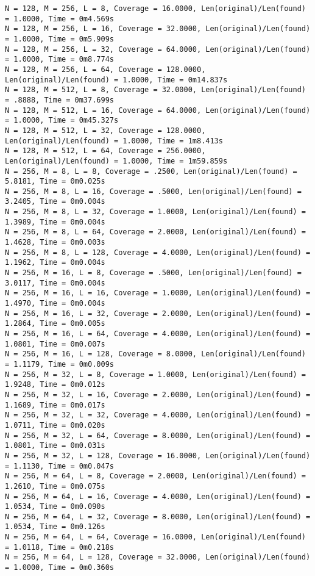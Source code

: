 \documentclass{article}
\begin{document}
{\begin{verbatim}
N = 128, M = 256, L = 8, Coverage = 16.0000, Len(original)/Len(found) = 1.0000, Time = 0m4.569s
N = 128, M = 256, L = 16, Coverage = 32.0000, Len(original)/Len(found) = 1.0000, Time = 0m5.909s
N = 128, M = 256, L = 32, Coverage = 64.0000, Len(original)/Len(found) = 1.0000, Time = 0m8.774s
N = 128, M = 256, L = 64, Coverage = 128.0000, Len(original)/Len(found) = 1.0000, Time = 0m14.837s
N = 128, M = 512, L = 8, Coverage = 32.0000, Len(original)/Len(found) = .8888, Time = 0m37.699s
N = 128, M = 512, L = 16, Coverage = 64.0000, Len(original)/Len(found) = 1.0000, Time = 0m45.327s
N = 128, M = 512, L = 32, Coverage = 128.0000, Len(original)/Len(found) = 1.0000, Time = 1m8.413s
N = 128, M = 512, L = 64, Coverage = 256.0000, Len(original)/Len(found) = 1.0000, Time = 1m59.859s
N = 256, M = 8, L = 8, Coverage = .2500, Len(original)/Len(found) = 5.8181, Time = 0m0.025s
N = 256, M = 8, L = 16, Coverage = .5000, Len(original)/Len(found) = 3.2405, Time = 0m0.004s
N = 256, M = 8, L = 32, Coverage = 1.0000, Len(original)/Len(found) = 1.3989, Time = 0m0.004s
N = 256, M = 8, L = 64, Coverage = 2.0000, Len(original)/Len(found) = 1.4628, Time = 0m0.003s
N = 256, M = 8, L = 128, Coverage = 4.0000, Len(original)/Len(found) = 1.1962, Time = 0m0.004s
N = 256, M = 16, L = 8, Coverage = .5000, Len(original)/Len(found) = 3.0117, Time = 0m0.004s
N = 256, M = 16, L = 16, Coverage = 1.0000, Len(original)/Len(found) = 1.4970, Time = 0m0.004s
N = 256, M = 16, L = 32, Coverage = 2.0000, Len(original)/Len(found) = 1.2864, Time = 0m0.005s
N = 256, M = 16, L = 64, Coverage = 4.0000, Len(original)/Len(found) = 1.0801, Time = 0m0.007s
N = 256, M = 16, L = 128, Coverage = 8.0000, Len(original)/Len(found) = 1.1179, Time = 0m0.009s
N = 256, M = 32, L = 8, Coverage = 1.0000, Len(original)/Len(found) = 1.9248, Time = 0m0.012s
N = 256, M = 32, L = 16, Coverage = 2.0000, Len(original)/Len(found) = 1.1689, Time = 0m0.017s
N = 256, M = 32, L = 32, Coverage = 4.0000, Len(original)/Len(found) = 1.0711, Time = 0m0.020s
N = 256, M = 32, L = 64, Coverage = 8.0000, Len(original)/Len(found) = 1.0801, Time = 0m0.031s
N = 256, M = 32, L = 128, Coverage = 16.0000, Len(original)/Len(found) = 1.1130, Time = 0m0.047s
N = 256, M = 64, L = 8, Coverage = 2.0000, Len(original)/Len(found) = 1.2610, Time = 0m0.075s
N = 256, M = 64, L = 16, Coverage = 4.0000, Len(original)/Len(found) = 1.0534, Time = 0m0.090s
N = 256, M = 64, L = 32, Coverage = 8.0000, Len(original)/Len(found) = 1.0534, Time = 0m0.126s
N = 256, M = 64, L = 64, Coverage = 16.0000, Len(original)/Len(found) = 1.0118, Time = 0m0.218s
N = 256, M = 64, L = 128, Coverage = 32.0000, Len(original)/Len(found) = 1.0000, Time = 0m0.360s

\end{verbatim}}
\end{document}
